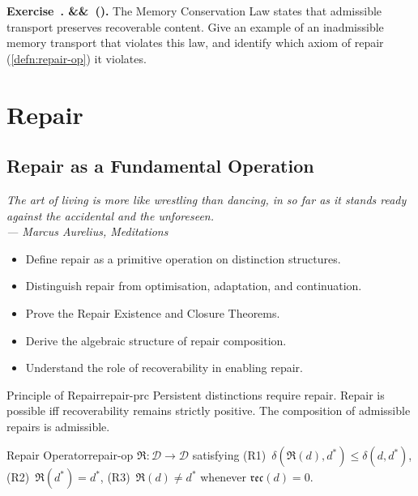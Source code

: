 \documentclass[12pt,twoside,openright]{book}
\newcommand{\repair}{\mathfrak{R}}
\newcommand{\reco}{\mathfrak{rec}}
\newenvironment{epigraph}[2]{%
  \vspace{1em}\begin{flushright}
  \begin{minipage}{0.72\textwidth}
  \itshape\small #1\\[0.4em]
  \upshape\footnotesize\sffamily\color{DistGray}--- #2
  \end{minipage}\end{flushright}\vspace{1.5em}}{}
\newenvironment{objectives}{%
  \begin{tcolorbox}[colback=DistBlue!5,colframe=DistBlue,
    title={\faCheckCircle\enspace Learning Objectives},
    fonttitle=\sffamily\bfseries\color{white},
    attach boxed title to top left={yshift=-2mm,xshift=4mm},
    boxed title style={colback=DistBlue},breakable]
  \begin{itemize}[leftmargin=*,nosep]}{%
  \end{itemize}\end{tcolorbox}\vspace{1em}}
\newcounter{exercise}[chapter]
\newenvironment{exercise}[1][]{%
  \refstepcounter{exercise}%
  \noindent\textbf{\sffamily\color{DistBlue}%
  Exercise~\thechapter.\theexercise%
  \ifx&#1&\else~(#1)\fi.}\enspace}{\par\medskip}
\begin{document}
\begin{exercise}
  The Memory Conservation Law states that admissible
  transport preserves recoverable content.
  Give an example of an inadmissible memory transport
  that violates this law, and identify which axiom of
  repair (\cref{defn:repair-op}) it violates.
\end{exercise}

\part{Repair}

\chapter{Repair as a Fundamental Operation}
\label{ch:repair}
\begin{epigraph}{The art of living is more like wrestling
  than dancing, in so far as it stands ready against the
  accidental and the unforeseen.}%
  {Marcus Aurelius, \textit{Meditations} \parencite{aurelius}}
\end{epigraph}

\begin{objectives}
  \item Define repair as a primitive operation on
        distinction structures.
  \item Distinguish repair from optimisation, adaptation,
        and continuation.
  \item Prove the Repair Existence and Closure Theorems.
  \item Derive the algebraic structure of repair
        composition.
  \item Understand the role of recoverability in enabling
        repair.
\end{objectives}

\begin{principle}{Principle of Repair}{repair-prc}
  Persistent distinctions require repair. Repair is
  possible iff recoverability remains strictly positive.
  The composition of admissible repairs is admissible.
\end{principle}

\begin{definition}{Repair Operator}{repair-op}
  $\repair:\mathcal{D}\to\mathcal{D}$ satisfying
  (R1)~$\delta(\repair(d),d^*)\le\delta(d,d^*)$,
  (R2)~$\repair(d^*)=d^*$,
  (R3)~$\repair(d)\ne d^*$ whenever $\reco(d)=0$.
\end{definition}
\end{document}
